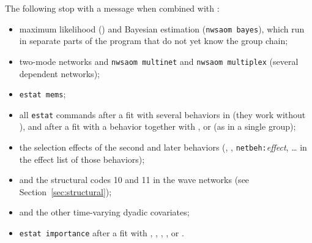 The following stop with a message when combined with :
\begin{itemize}[nosep]
  \item maximum likelihood () and Bayesian estimation (\texttt{nwsaom bayes}), which run in separate parts of the program that do not yet know the group chain;
  \item two-mode networks and \texttt{nwsaom multinet} and \texttt{nwsaom multiplex} (several dependent networks);
  \item \texttt{estat mems};
  \item all \texttt{estat} commands after a fit with several behaviors in  (they work without ), and after a fit with a behavior together with ,  or  (as in a single group);
  \item the selection effects of the second and later behaviors (, , \texttt{netbeh:}\emph{effect}, \dots{} in the effect list of those behaviors);
  \item {} and the structural codes 10 and 11 in the wave networks (see Section~\ref{sec:structural});
  \item {} and the other time-varying dyadic covariates;
  \item \texttt{estat importance} after a fit with , , , ,  or .
\end{itemize}
